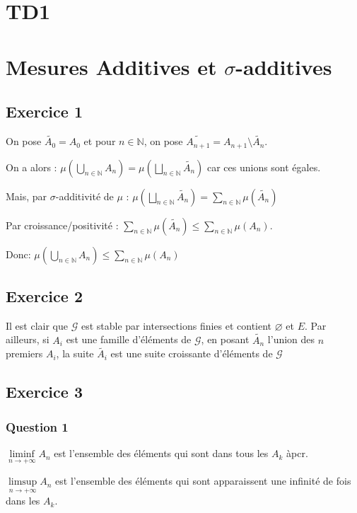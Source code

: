 \documentclass{cours}
\begin{document}
\section{TD1}

\section{Mesures Additives et $\sigma$-additives}
\subsection{Exercice 1}
On pose $\tilde{A_{0}} = A_{0}$ et pour $n \in \mathbb{N}$, on pose $\tilde{A_{n+1}} = A_{n+1} \setminus \tilde{A_{n}}$.

On a alors : $\mu \left(\bigcup\limits_{n\in\mathbb{N}}A_{n}\right) = \mu\left(\bigsqcup\limits_{n\in\mathbb{N}}\tilde{A_{n}}\right)$ car ces unions sont égales.

Mais, par $\sigma$-additivité de $\mu$ : $\mu\left(\bigsqcup\limits_{n\in\mathbb{N}}\tilde{A_{n}}\right) = \sum_{n\in \mathbb{N}}\mu\left(\tilde{A_{n}}\right)$

Par croissance/positivité : $\sum_{n\in \mathbb{N}}\mu\left(\tilde{A_{n}}\right) \leq \sum_{n\in \mathbb{N}}\mu\left(A_{n}\right)$.

Donc: $\mu \left(\bigcup\limits_{n\in\mathbb{N}}A_{n}\right)\leq \sum_{n\in \mathbb{N}}\mu\left(A_{n}\right)$

\subsection{Exercice 2}
Il est clair que $\mathcal{G}$ est stable par intersections finies et contient $\varnothing$ et $E$. Par ailleurs, si $A_{i}$ est une famille d'éléments de $\mathcal{G}$, en posant $\tilde{A_{n}}$ l'union des $n$ premiers $A_{i}$, la suite $\tilde{A_{i}}$ est une suite croissante d'éléments de $\mathcal{G}$

\subsection{Exercice 3}
\subsubsection{Question 1}
$\liminf\limits_{n\to +\infty} A_{n}$ est l'ensemble des éléments qui sont dans tous les $A_{k}$ àpcr.

$\limsup\limits_{n\to +\infty} A_{n}$ est l'ensemble des éléments qui sont apparaissent une infinité de fois dans les $A_{k}$.
\end{document}
